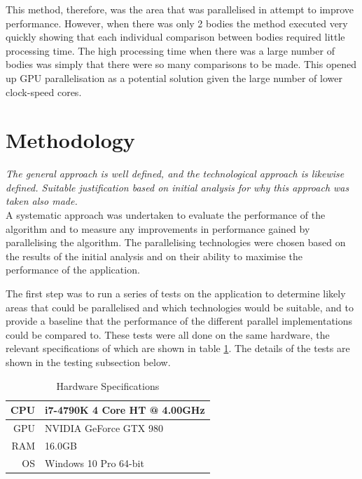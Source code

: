 \documentclass[12pt,journal,transmag]{IEEEtran}
\begin{document}
	This method, therefore, was the area that was parallelised in attempt to improve performance. However, when there was only 2 bodies the method executed very quickly showing that each individual comparison between bodies required little processing time. The high processing time when there was a large number of bodies was simply that there were so many comparisons to be made. This opened up GPU parallelisation as a potential solution given the large number of lower clock-speed cores.
	
	\section{Methodology}
	
	\textit{The general approach is well defined, and the technological approach is likewise defined. Suitable justification based on initial analysis for why this approach was taken also made.}\\
	
	A systematic approach was undertaken to evaluate the performance of the algorithm and to measure any improvements in performance gained by parallelising the algorithm. The parallelising technologies were chosen based on the results of the initial analysis and on their ability to maximise the performance of the application.
	
	The first step was to run a series of tests on the application to determine likely areas that could be parallelised and which technologies would be suitable, and to provide a baseline that the performance of the different parallel implementations could be compared to. These tests were all done on the same hardware, the relevant specifications of which are shown in table \ref{hardware}. The details of the tests are shown in the testing subsection below.
	
	\begin{table}[!h]
		\renewcommand{\arraystretch}{1.3}
		\caption{Hardware Specifications}
		\label{hardware}
		\centering
		\begin{tabular}{r|l}
			\toprule
			CPU & i7-4790K 4 Core HT @ 4.00GHz\\ \hline
			GPU & NVIDIA GeForce GTX 980 \\ \hline
			RAM & 16.0GB\\ \hline
			OS & Windows 10 Pro 64-bit\\ \bottomrule
		\end{tabular}
	\end{table}
	
\end{document}

